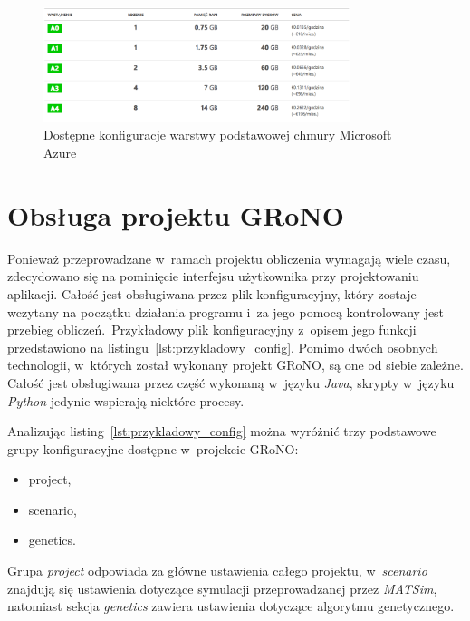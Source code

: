 \documentclass[twoside,12pt]{report}
\begin{document}
\begin{figure}[htbp]
	\centering
	\includegraphics[width=0.8\textwidth]{img/azure_opcje}
	\caption{Dostępne konfiguracje warstwy podstawowej chmury Microsoft Azure}
	\label{fig:azure_dostepne_opcje}
\end{figure}

\section{Obsługa projektu GRoNO}\label{rozdz.konfiguracja_GRoNO}
Ponieważ przeprowadzane w~ramach projektu obliczenia wymagają wiele czasu, zdecydowano się na pominięcie interfejsu użytkownika przy projektowaniu aplikacji. Całość jest obsługiwana przez plik konfiguracyjny, który zostaje wczytany na początku działania programu i~za jego pomocą kontrolowany jest przebieg obliczeń.~Przykładowy plik konfiguracyjny z~opisem jego funkcji przedstawiono na listingu~\ref{lst:przykladowy_config}. Pomimo dwóch osobnych technologii, w~których został wykonany projekt GRoNO, są one od siebie zależne. Całość jest obsługiwana przez część wykonaną  w~języku \textit{Java}, skrypty w~języku \textit{Python} jedynie wspierają niektóre procesy. 

 

Analizując listing~\ref{lst:przykladowy_config} można wyróżnić trzy podstawowe grupy konfiguracyjne dostępne w~projekcie GRoNO:
\begin{itemize}
\item project,
\item scenario,
\item genetics.
\end{itemize}

Grupa \textit{project} odpowiada za główne ustawienia całego projektu, w~\textit{scenario} znajdują się ustawienia dotyczące symulacji przeprowadzanej przez \textit{MATSim}, natomiast sekcja \textit{genetics} zawiera ustawienia dotyczące algorytmu genetycznego.
\end{document}
